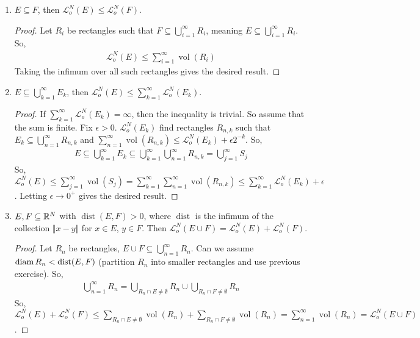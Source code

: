 \documentclass{report}
\DeclareMathOperator{\vol}{vol}
\DeclareMathOperator{\dist}{dist}
\begin{document}
\begin{enumerate}
    \item $E \subseteq F$, then $\mathcal L_o^N(E) \leq \mathcal L_o^N(F)$.
    \begin{proof}
        Let $R_i$ be rectangles such that $F \subseteq \bigcup_{i=1}^\infty R_i$, meaning $E \subseteq \bigcup_{i=1}^\infty R_i$. So,
        \begin{align*}
            \mathcal L_o^N(E) \leq \sum_{i=1}^\infty \vol(R_i)
        \end{align*}
        Taking the infimum over all such rectangles gives the desired result.
    \end{proof}
    \item $E \subseteq \bigcup_{k=1}^\infty E_k$, then $\mathcal L_o^N(E) \leq \sum_{k=1}^\infty \mathcal L_o^N(E_k)$.
    \begin{proof}
        If $\sum_{k=1}^\infty \mathcal L_o^N(E_k) = \infty$, then the inequality is trivial. So assume that the sum is finite. Fix $\epsilon > 0$. $\mathcal L_o^N(E_k)$ find rectangles $R_{n, k}$ such that $E_k \subseteq \bigcup_{n=1}^\infty R_{n, k}$ and $\sum_{n=1}^\infty \vol(R_{n, k}) \leq \mathcal L_o^N(E_k) + \epsilon 2^{-k}$. So,
        \begin{align*}
            E \subseteq \bigcup_{k=1}^\infty E_k \subseteq \bigcup_{k=1}^\infty \bigcup_{n=1}^\infty R_{n, k} = \bigcup_{j = 1}^\infty S_j
        \end{align*}
        So, $\mathcal L_o^N(E) \leq \sum_{j=1}^\infty \vol(S_j) = \sum_{k=1}^\infty \sum_{n=1}^\infty \vol(R_{n, k}) \leq \sum_{k=1}^\infty \mathcal L_o^N(E_k) + \epsilon$.
        Letting $\epsilon \to 0^+$ gives the desired result.
    \end{proof}
    \item $E, F \subseteq \RR^N$ with $\dist(E, F) > 0$, where $\dist$ is the infimum of the collection $\Vert x- y \Vert$ for $x \in E$, $y \in F$. Then $\mathcal L_o^N(E \cup F) = \mathcal L_o^N(E) + \mathcal L_o^N(F)$.
    \begin{proof}
        Let $R_n$ be rectangles, $E \cup F \subseteq \bigcup_{n=1}^\infty R_n$. Can we assume $\diam R_n < \dist(E, F)$ (partition $R_n$ into smaller rectangles and use previous exercise). So,
        \begin{align*}
            \bigcup_{n=1}^\infty R_n = \bigcup_{R_n \cap E \neq \emptyset} R_n \cup \bigcup_{R_n \cap F \neq \emptyset} R_n
        \end{align*}
        So, $\mathcal L_o^N(E) + \mathcal L_o^N(F) \leq \sum_{R_n \cap E \neq \emptyset} \vol(R_n) + \sum_{R_n \cap F \neq \emptyset} \vol(R_n) = \sum_{n=1}^\infty \vol(R_n) = \mathcal L_o^N(E \cup F)$.
    \end{proof}
\end{enumerate}
\newpage
{}
\end{document}
